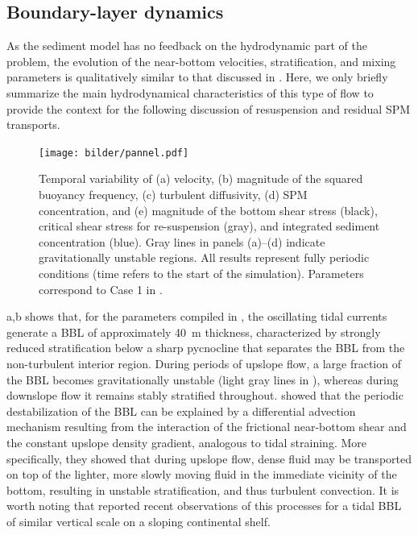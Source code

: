 \subsection{Boundary-layer dynamics\label{sec:examp}}

As the sediment model has no feedback on the hydrodynamic part of the
problem, the evolution of the near-bottom velocities, stratification,
and mixing parameters is qualitatively similar to that discussed in
\cite{UmlaufBurchard2011a}. Here, we only briefly summarize the main
hydrodynamical characteristics of this type of flow to provide the
context for the following discussion of resuspension and residual SPM
transports.
\begin{figure}[h]
  \noindent\texttt{[image: bilder/pannel.pdf]}\\
  \caption{Temporal variability of (a) velocity, (b) magnitude of the
    squared buoyancy frequency, (c) turbulent diffusivity, (d) SPM
    concentration, and (e) magnitude of the bottom shear stress
    (black), critical shear stress for re-suspension (gray), and
    integrated sediment concentration (blue). Gray lines in panels
    (a)--(d) indicate gravitationally unstable regions. All results
    represent fully periodic conditions (time refers to the start of
    the simulation). Parameters correspond to Case 1 in
    . }\label{pannelgrafik}
\end{figure}

a,b shows that, for the parameters compiled in
, the oscillating tidal currents generate a BBL of
approximately 40~m thickness, characterized by strongly reduced
stratification below a sharp pycnocline that separates the BBL from
the non-turbulent interior region. During periods of upslope flow, a
large fraction of the BBL becomes gravitationally unstable (light gray
lines in ), whereas during downslope flow it remains
stably stratified throughout. \cite{UmlaufBurchard2011a} showed that
the periodic destabilization of the BBL can be explained by a
differential advection mechanism resulting from the interaction of the
frictional near-bottom shear and the constant upslope density
gradient, analogous to tidal straining. More specifically, they showed
that during upslope flow, dense fluid may be transported on top of the
lighter, more slowly moving fluid in the immediate vicinity of the
bottom, resulting in unstable stratification, and thus turbulent
convection. It is worth noting that \cite{Endohetal2016a} reported
recent observations of this processes for a tidal BBL of similar
vertical scale on a sloping continental shelf.

